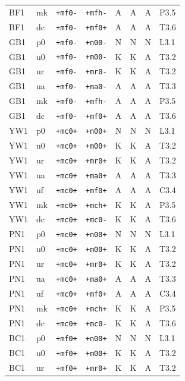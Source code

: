 {\begin{longtable}{@{}llllcccl@{}}
BF1 & mk & \texttt{+mf0-} & \texttt{+mfh-} & A & A & A & P3.5 \\
BF1 & dc & \texttt{+mf0-} & \texttt{+mf0+} & A & A & A & T3.6 \\
GB1 & p0 & \texttt{+mf0-} & \texttt{+n00-} & N & N & N & L3.1 \\
GB1 & u0 & \texttt{+mf0-} & \texttt{+m00-} & K & K & A & T3.2 \\
GB1 & ur & \texttt{+mf0-} & \texttt{+mr0-} & K & K & A & T3.2 \\
GB1 & ua & \texttt{+mf0-} & \texttt{+ma0-} & A & A & A & T3.3 \\
GB1 & mk & \texttt{+mf0-} & \texttt{+mfh-} & A & A & A & P3.5 \\
GB1 & dc & \texttt{+mf0-} & \texttt{+mf0+} & A & A & A & T3.6 \\
YW1 & p0 & \texttt{+mc0+} & \texttt{+n00+} & N & N & N & L3.1 \\
YW1 & u0 & \texttt{+mc0+} & \texttt{+m00+} & K & K & A & T3.2 \\
YW1 & ur & \texttt{+mc0+} & \texttt{+mr0+} & K & K & A & T3.2 \\
YW1 & ua & \texttt{+mc0+} & \texttt{+ma0+} & A & A & A & T3.3 \\
YW1 & uf & \texttt{+mc0+} & \texttt{+mf0+} & A & A & A & C3.4 \\
YW1 & mk & \texttt{+mc0+} & \texttt{+mch+} & K & K & A & P3.5 \\
YW1 & dc & \texttt{+mc0+} & \texttt{+mc0-} & K & K & A & T3.6 \\
PN1 & p0 & \texttt{+mc0+} & \texttt{+n00+} & N & N & N & L3.1 \\
PN1 & u0 & \texttt{+mc0+} & \texttt{+m00+} & K & K & A & T3.2 \\
PN1 & ur & \texttt{+mc0+} & \texttt{+mr0+} & K & K & A & T3.2 \\
PN1 & ua & \texttt{+mc0+} & \texttt{+ma0+} & A & A & A & T3.3 \\
PN1 & uf & \texttt{+mc0+} & \texttt{+mf0+} & A & A & A & C3.4 \\
PN1 & mk & \texttt{+mc0+} & \texttt{+mch+} & K & K & A & P3.5 \\
PN1 & dc & \texttt{+mc0+} & \texttt{+mc0-} & K & K & A & T3.6 \\
BC1 & p0 & \texttt{+mf0+} & \texttt{+n00+} & N & N & N & L3.1 \\
BC1 & u0 & \texttt{+mf0+} & \texttt{+m00+} & K & K & A & T3.2 \\
BC1 & ur & \texttt{+mf0+} & \texttt{+mr0+} & K & K & A & T3.2 \\

\end{longtable}}
